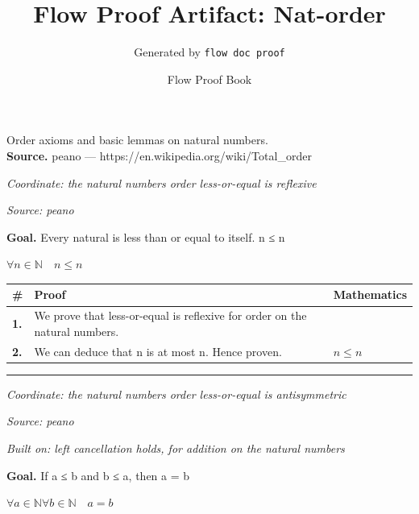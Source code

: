 \documentclass[11pt]{article}
\title{Flow Proof Artifact: Nat-order}
\author{Generated by \texttt{flow doc proof}}
\date{Flow Proof Book}
\theoremstyle{definition}
\begin{document}
\maketitle
Order axioms and basic lemmas on natural numbers.\\[0.5em]
\textbf{Source.} peano — https://en.wikipedia.org/wiki/Total\_order\\[0.5em]
\bigskip
{}\par
\smallskip\noindent\textit{Coordinate: the natural numbers \cdot order \cdot less-or-equal is reflexive}\par
\smallskip\noindent\textit{Source: peano}\par
\medskip
\noindent\textbf{Goal.} Every natural is less than or equal to itself.  n ≤ n\par
\noindent$\displaystyle \forall n \in \mathbb{N}\quad n \le n$\par
\medskip
\noindent
\begin{tabular}{@{} >{\raggedright\arraybackslash}p{} >{\raggedright\arraybackslash}p{} >{\raggedleft\arraybackslash}p{} @{}}
\textbf{\#} & \textbf{Proof} & \textbf{Mathematics} \\
\midrule
\textbf{1.} & We prove that less-or-equal is reflexive for order on the natural numbers. & \\[0.45em]
\textbf{2.} & We can deduce that n is at most n. Hence proven. & $\displaystyle n \le n$ \\[0.45em]
\bottomrule
\end{tabular}
\label{thm:Nat-order-less_or_equal_is_reflexive}
\par\medskip\hrule
\bigskip
{}\par
\smallskip\noindent\textit{Coordinate: the natural numbers \cdot order \cdot less-or-equal is antisymmetric}\par
\smallskip\noindent\textit{Source: peano}\par
\smallskip\noindent\textit{Built on: left cancellation holds, for addition on the natural numbers}\par
\medskip
\noindent\textbf{Goal.} If a ≤ b and b ≤ a, then a = b\par
\noindent$\displaystyle \forall a \in \mathbb{N} \forall b \in \mathbb{N}\quad a = b$\par
\end{document}
